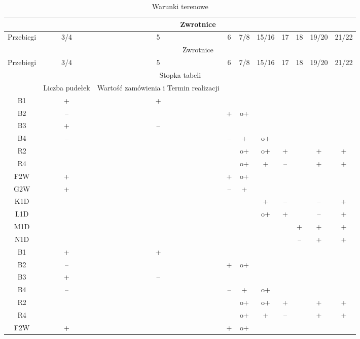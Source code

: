 \documentclass[a4paper,10pt]{report}
\begin{document}
	
	\begin{longtable}{|c|c|c|c|c|c|c|c|c|c|}
		\caption{Warunki terenowe}
		\label{tab:warunkiTerenowe}\\
		\cline{2-10} 
		\multicolumn{1}{l|}{} & \multicolumn{9}{|c|}{Zwrotnice} \\ \hline
		{Przebiegi} & 3/4 & 5 & 6 & 7/8 & 15/16 & 17 & 18 & 19/20 & 21/22 \\ \hline
		\endfirsthead
		\cline{2-10} 
		\multicolumn{1}{l|}{} & \multicolumn{9}{|c|}{Zwrotnice} \\ \hline
		{Przebiegi} & 3/4 & 5 & 6 & 7/8 & 15/16 & 17 & 18 & 19/20 & 21/22 \\ \hline
		\endhead
		\multicolumn{10}{|c|}{Stopka tabeli} \\ \hline
		\endfoot
		\multicolumn{2}{|c|c c c}{Identyfikator}&{ Liczba pudełek}&{ Wartość zamówienia i Termin realizacji} \\ \hline
		\endlastfoot
		B1 & + & + &  &  &  &  &  &  &  \\ \hline
		B2 & -- &  & + & o+ &  &  &  &  &  \\ \hline
		B3 & + & -- &  &  &  &  &  &  &  \\ \hline
		B4 & -- &  & -- & + & o+ &  &  &  &  \\ \hline
		R2 &  &  &  & o+ & o+ & + &  & + & + \\ \hline
		R4 &  &  &  & o+ & + & -- &  & + & + \\ \hline
		F2W & + &  & + & o+ &  &  &  &  &  \\ \hline
		G2W & + &  & -- & + &  &  &  &  &  \\ \hline
		K1D &  &  &  &  & + & -- &  & -- & + \\ \hline
		L1D &  &  &  &  & o+ & + &  & -- & + \\ \hline
		M1D &  &  &  &  &  &  & + & + & + \\ \hline
		N1D &  &  &  &  &  &  & -- & + & + \\ \hline
		B1 & + & + &  &  &  &  &  &  &  \\ \hline
		B2 & -- &  & + & o+ &  &  &  &  &  \\ \hline
		B3 & + & -- &  &  &  &  &  &  &  \\ \hline
		B4 & -- &  & -- & + & o+ &  &  &  &  \\ \hline
		R2 &  &  &  & o+ & o+ & + &  & + & + \\ \hline
		R4 &  &  &  & o+ & + & -- &  & + & + \\ \hline
		F2W & + &  & + & o+ &  &  &  &  &  \\ \hline

\end{longtable}
\end{document}
